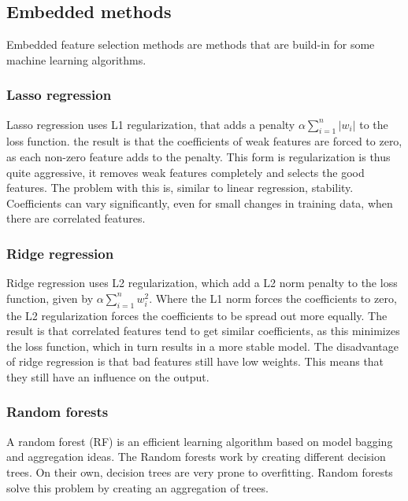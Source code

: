 
\subsection{Embedded methods}
Embedded feature selection methods are methods that are build-in for some machine learning algorithms.

\subsubsection{Lasso regression}
\label{lassoregression}
Lasso regression uses L1 regularization, that adds a penalty $\alpha\sum\limits_{i=1}^{n} |w_i|$ to the loss function. the result is that the coefficients of weak features are forced to zero, as each non-zero feature adds to the penalty. This form is regularization is thus quite aggressive, it removes weak features completely and selects the good features. The problem with this is, similar to linear regression, stability. Coefficients can vary significantly, even for small changes in training data, when there are correlated features.

\subsubsection{Ridge regression}
Ridge regression uses L2 regularization, which add a L2 norm penalty to the loss function, given by $\alpha\sum\limits_{i=1}^{n} w_i^2$. Where the L1 norm forces the coefficients to zero, the L2 regularization forces the coefficients to be spread out more equally. The result is that correlated features tend to get similar coefficients, as this minimizes the loss function, which in turn results in a more stable model. The disadvantage of ridge regression is that bad features still have low weights. This means that they still have an influence on the output.

\subsubsection{Random forests}
\label{rfexpl}
A random forest (RF)  is an efficient learning algorithm based on model bagging and aggregation ideas\citep{rfPaper}. The Random forests work by creating different decision trees. On their own, decision trees are very prone to overfitting. Random forests solve this problem by creating an aggregation of trees. 

